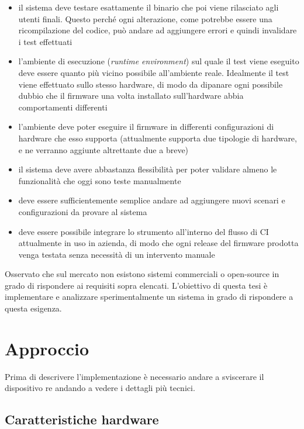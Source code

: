 \documentclass[12pt,a4paper,twoside,titlepage]{book}
\begin{document}
\begin{itemize}
    \item il sistema deve testare esattamente il binario che poi viene rilasciato agli utenti finali.
        Questo perché ogni alterazione, come potrebbe essere una ricompilazione del codice, può andare
        ad aggiungere errori e quindi invalidare i test effettuati
    \item l'ambiente di esecuzione (\textit{runtime environment}) sul quale il test viene eseguito deve essere quanto
        più vicino possibile all'ambiente reale. Idealmente il test viene effettuato sullo stesso hardware,
        di modo da dipanare ogni possibile dubbio che il \gls{firmware} una volta installato sull'hardware abbia
        comportamenti differenti
    \item l'ambiente deve poter eseguire il \gls{firmware} in differenti configurazioni di hardware che esso supporta
        (attualmente supporta due tipologie di hardware, e ne verranno aggiunte altrettante due a breve)
    \item il sistema deve avere abbastanza flessibilità per poter validare almeno le funzionalità che oggi
        sono teste manualmente
    \item deve essere sufficientemente semplice andare ad aggiungere nuovi scenari e configurazioni da provare al sistema
    \item deve essere possibile integrare lo strumento all'interno del flusso di CI attualmente in
        uso in azienda, di modo che ogni release del \gls{firmware} prodotta venga testata senza necessità di
        un intervento manuale
\end{itemize}

Osservato che sul mercato non esistono sistemi commerciali o open-source in grado di rispondere ai requisiti 
sopra elencati. L'obiettivo di questa tesi è implementare e analizzare sperimentalmente un sistema in grado di 
rispondere a questa esigenza. 

\chapter{Approccio}

Prima di descrivere l'implementazione è necessario andare a sviscerare il dispositivo \Gls{re}
andando a vedere i dettagli più tecnici.

\section{Caratteristiche hardware}
\end{document}
